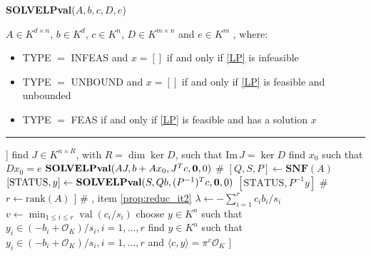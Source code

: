 \documentclass[a4paper,oneside,11pt]{article}
\DeclareMathOperator{\val}{val}
\newcommand{\OK}{\mathcal{O}_K}
\begin{document}
\begin{algorithm}
    \caption{\textbf{SOLVELPval}($A,b,c,D,e$)}\label{algo_LP}
    \begin{algorithmic}[1]
      \REQUIRE
      $A \in K^{d\times n}$, $b \in K^d$, $c \in K^n$, $D \in K^{m \times n}$ and $e \in K^m$
      \ENSURE [TYPE, $x$], where:
      \vspace{-0.25cm}
      \begin{itemize}
      \item[]
        TYPE $=$ INFEAS and $x=[]$ if and only if \eqref{LP} is infeasible
      \vspace{-0.25cm}
      \item[]
        TYPE $=$ UNBOUND and $x=[]$ if and only if \eqref{LP} is feasible and unbounded
      \vspace{-0.25cm}
      \item[]
        TYPE $=$ FEAS if and only if \eqref{LP} is feasible and has a solution $x$
      \end{itemize}
      \vspace{-0.1cm}
      \hrule
      \vspace{0.1cm}
        \RETURN [INFEAS, []] \label{step:linear_empty}
      \ENDIF
       \label{step:reducD:begin}
        \STATE find $J \in K^{n \times R}$, with $R = \dim\ker D$, such that $\text{Im}\, J = \ker D$
        \STATE find $x_0$ such that $Dx_0=e$ \label{step:reducD:end}
        \RETURN $\textbf{SOLVELPval}(AJ,b+A x_0,J^T c, {\bf 0},0)$ \label{step:reducD} \hfill {\color{olive} \# }
      \ENDIF
       \label{step:solsLP:begin}
        \STATE $[Q,S,P] \leftarrow \textbf{SNF}(A)$
        \STATE $[\mathrm{STATUS}, y] \leftarrow \textbf{SOLVELPval}(S,Qb,(P^{-1})^Tc,{\bf 0},0)$ \label{step:solsLP:end}
        \RETURN $[\mathrm{STATUS}, P^{-1}y]$ \hfill {\color{olive} \# } \label{step:solsLP}
      \ENDIF
      \STATE $r \leftarrow \text{rank}(A)$ \label{step:core:begin}
      \IF{$\bigwedge_{i=r+1}^d \val(b_{i}) \geq 0$}
        \RETURN [UNBOUND, []] \hfill {\color{olive} \# , item \ref{prop:reduc_it2}}
        \ELSE
          \STATE $\lambda \leftarrow -\sum_{i=1}^r c_i b_i / s_i$
          \STATE $v \leftarrow \min_{1 \leq i \leq r} \val (c_i/s_i)$
          \IF{$\val \lambda < v$}
            \STATE choose $y \in K^n$ such that $y_i \in (-b_i+\OK)/s_i, i=1,\ldots,r$
            \RETURN [FEAS, $y$]
          \ELSE
            \STATE find $y \in K^n$ such that $y_i \in (-b_i+\OK)/s_i, i=1,\ldots,r$
            and $\langle c,y\rangle = \pi^v\OK$
            \RETURN [FEAS, $y$]
          \ENDIF
        \ENDIF 
      \ENDIF
      \RETURN [INFEAS, []]
    \end{algorithmic}
\end{algorithm}
\end{document}
